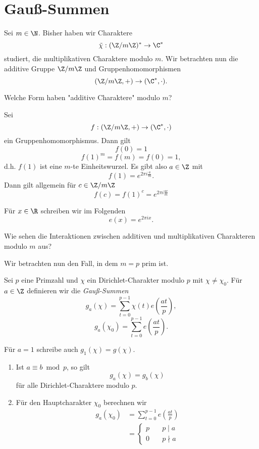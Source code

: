 \section{Gauß-Summen}

Sei $m \in \N$. Bisher haben wir Charaktere
\[ \tilde{\chi}: (\Z/m\Z)^* \to \C^* \]
studiert, die multiplikativen Charaktere modulo $m$. Wir betrachten nun die additive Gruppe $\Z/m\Z$ und  Gruppenhomomorphismen
\[ (\Z/m\Z,+) \to (\C^*,\cdot). \]

\begin{frage*}
	Welche Form haben "additive Charaktere" modulo $m$?
\end{frage*}

Sei 
\[ f: (\Z/m\Z,+) \to (\C^*,\cdot) \]
ein Gruppenhomomorphismus. Dann gilt
\[ f(0) = 1 \]
\[ f(1)^m = f(m) = f(0) = 1, \]
d.h. $f(1)$ ist eine $m$-te Einheitswurzel. Es gibt also $a \in \Z$ mit
\[ f(1) = e^{2\pi i \frac{a}{m}}. \]
Dann gilt allgemein für $c \in \Z/m\Z$
\[ f(c) = f(1)^c = e^{2\pi i \frac{ac}{m}} \]

\begin{notat*}
	Für $x \in \R$ schreiben wir im Folgenden
	\[ e(x) = e^{2\pi i x}. \]
\end{notat*}

\begin{frage*}
	Wie sehen die Interaktionen zwischen additiven und multiplikativen Charakteren modulo $m$ aus?
\end{frage*}

Wir betrachten nun den Fall, in dem $m=p$ prim ist.

\begin{defn*}
	Sei $p$ eine Primzahl und $\chi$ ein Dirichlet-Charakter modulo $p$ mit $\chi \neq \chi_0$. Für $a \in \Z$ definieren wir die \emph{Gauß-Summen}
	\[ g_a(\chi) = \sum_{t=0}^{p-1} \chi(t) e\left( \frac{at}{p} \right), \]
	\[ g_a(\chi_0) = \sum_{t=0}^{p-1} e\left( \frac{at}{p} \right). \]
\end{defn*}

\begin{notat*}
	Für $a=1$ schreibe auch $g_1(\chi) = g(\chi)$.
\end{notat*}

\begin{rem*}
	\begin{enumerate}[label={\roman*})]
		\item Ist $a \equiv b \bmod p$, so gilt
			\[ g_a(\chi) = g_b(\chi) \]
			für alle Dirichlet-Charaktere modulo $p$.
		\item Für den Hauptcharakter $\chi_0$ berechnen wir
			\begin{align*}
				g_a(\chi_0) &= \sum_{t=0}^{p-1} e\left( \frac{at}{p} \right)\\
				&= \begin{cases}
					p\quad &p \mid a\\
					0 &p \nmid a
				\end{cases}
			\end{align*}
	\end{enumerate}
\end{rem*}

